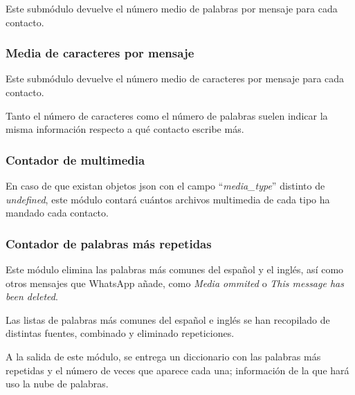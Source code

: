 Este submódulo devuelve el número medio de palabras por mensaje para cada contacto.

\subsubsection{Media de caracteres por mensaje}

Este submódulo devuelve el número medio de caracteres por mensaje para cada contacto.

Tanto el número de caracteres como el número de palabras suelen indicar la misma información respecto a qué contacto escribe más.

\subsubsection{Contador de multimedia}

En caso de que existan objetos \acrshort{json} con el campo ``\textit{media\_type}'' distinto de \textit{undefined}, este módulo contará cuántos archivos multimedia de cada tipo ha mandado cada contacto.

\subsubsection{Contador de palabras más repetidas}

Este módulo elimina las palabras más comunes del español y el inglés, así como otros mensajes que WhatsApp añade, como \textit{Media ommited} o \textit{This message has been deleted}.

Las listas de palabras más comunes del español e inglés se han recopilado de distintas fuentes, combinado y eliminado repeticiones.

A la salida de este módulo, se entrega un diccionario con las palabras más repetidas y el número de veces que aparece cada una; información de la que hará uso la nube de palabras.





